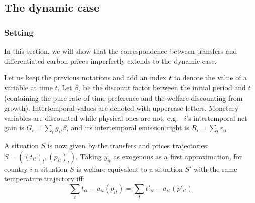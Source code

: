 \documentclass[12pt,english]{article}
\begin{document}

\subsection{The dynamic case}\label{the-dynamic-case}

\subsubsection*{Setting}\label{setting-1}

In this section, we will show that the correspondence between transfers
and differentiated carbon prices imperfectly extends to the dynamic
case.

Let us keep the previous notations and add an index $t$ to denote the
value of a variable at time $t$. Let $\beta_t$ be the discount
factor between the initial period and $t$ (containing the pure rate of
time preference and the welfare discounting from growth). Intertemporal
values are denoted with uppercase letters. Monetary variables are
discounted while physical ones are not, e.g.~ $i$'s intertemporal net
gain is $G_i = \sum_t g_{it} \beta_t$ and its intertemporal emission
right is $R_i = \sum_t r_{it}$.

A situation $S$ is now given by the transfers and prices trajectories:
$S=((t_{it})_t, (p_{it})_t)$. Taking $y_{it}$ as exogenous as a
first approximation, for country $i$ a situation $S$ is
welfare-equivalent to a situation $S'$ with the same temperature
trajectory iff:
$$\sum_t t_{it} - a_{it}(p_{it}) = \sum_t t'_{it} - a_{it}(p'_{it})$$
\end{document}
